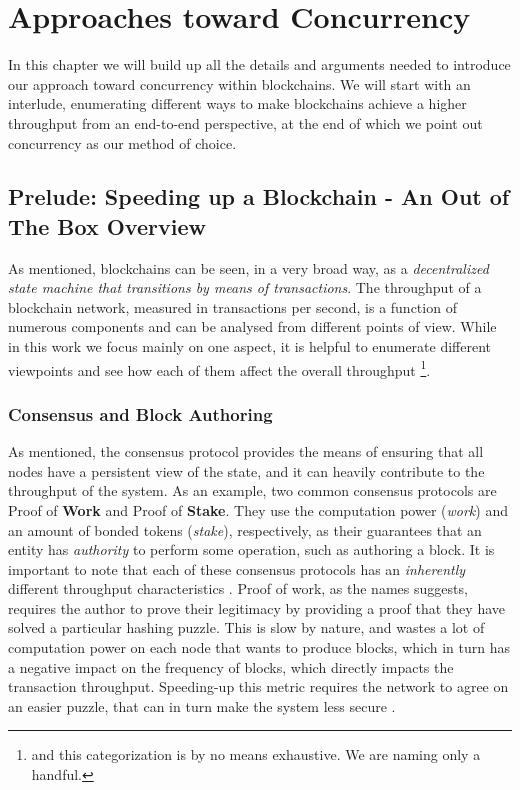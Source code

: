 \chapter{Approaches toward Concurrency} \label{chap:approach}

In this chapter we will build up all the details and arguments needed to introduce our approach
toward concurrency within blockchains. We will start with an interlude, enumerating different ways
to make blockchains achieve a higher throughput from an end-to-end perspective, at the end of which
we point out concurrency as our method of choice.

\section{Prelude: Speeding up a Blockchain - An Out of The Box
Overview}\label{chap_approach:sec:ways_to_speedup}

As mentioned, blockchains can be seen, in a very broad way, as a \textit{decentralized state machine
that transitions by means of transactions}. The throughput of a blockchain network, measured in
transactions per second, is a function of numerous components and can be analysed from different
points of view. While in this work we focus mainly on one aspect, it is helpful to enumerate
different viewpoints and see how each of them affect the overall throughput \footnote{and this
categorization is by no means exhaustive. We are naming only a handful.}.

\subsection{Consensus and Block Authoring}

As mentioned, the consensus protocol provides the means of ensuring that all nodes have a persistent
view of the state, and it can heavily contribute to the throughput of the system. As an example, two
common consensus protocols are Proof of \textbf{Work} and Proof of \textbf{Stake}. They use the
computation power (\textit{work}) and an amount of bonded tokens (\textit{stake}), respectively, as
their guarantees that an entity has \textit{authority} to perform some operation, such as authoring
a block. It is important to note that each of these consensus protocols has an \textit{inherently}
different throughput characteristics \cite{meneghettiSurveyEfficientParallelization2019}. Proof of
work, as the names suggests, requires the author to prove their legitimacy by providing a proof that
they have solved a particular hashing puzzle. This is slow by nature, and wastes a lot of
computation power on each node that wants to produce blocks, which in turn has a negative impact on
the frequency of blocks, which directly impacts the transaction throughput. Speeding-up this metric
requires the network to agree on an easier puzzle, that can in turn make the system less secure
\cite{gervaisSecurityPerformanceProof2016}.

